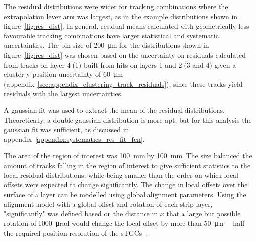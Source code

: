 The residual distributions were wider for tracking combinations where the extrapolation lever arm was largest, as in the example distributions shown in figure~\ref{fig:res_dist}. In general, residual means calculated with geometrically less favourable tracking combinations have larger statistical and systematic uncertainties. The bin size of \SI{200}{\micro\meter} for the distributions shown in figure~\ref{fig:res_dist} was chosen based on the uncertainty on residuals calculated from tracks on layer 4 (1) built from hits on layers 1 and 2 (3 and 4) given a cluster y-position uncertainty of \SI{60}{\micro\meter} (appendix~\ref{sec:appendix_clustering_track_residuals}), since these tracks yield residuals with the largest uncertainties.

A gaussian fit was used to extract the mean of the residual distributions. Theoretically, a double gaussian distribution is more apt, but for this analysis the gaussian fit was sufficient, as discussed in appendix~\ref{appendix:systematics_res_fit_fcn}.

The area of the region of interest was \SI{100}{\milli\meter} by \SI{100}{\milli\meter}. The size balanced the amount of tracks falling in the region of interest to give sufficient statistics to the local residual distributions, while being smaller than the order on which local offsets were expected to change significantly. The change in local offsets over the surface of a layer can be modelled using global alignment parameters. Using the alignment model with a global offset and rotation of each strip layer, "significantly" was defined based on the distance in $x$ that a large but possible rotation of \SI{1000}{\micro\radian} would change the local offset by more than \SI{50}{\micro\meter}~-- half the required position resolution of the sTGCs~\cite{nsw_tdr}.


